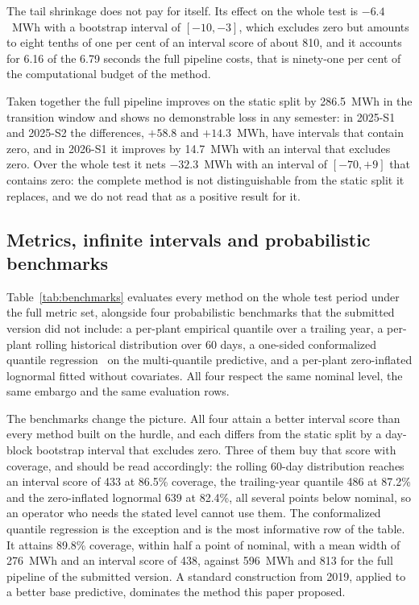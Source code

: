 \documentclass[preprint,3p,times]{elsarticle}
\begin{document}
The tail shrinkage does not pay for itself. Its effect on the whole test is $-6.4$~MWh with a bootstrap interval of $[-10,-3]$, which excludes zero but amounts to eight tenths of one per cent of an interval score of about 810, and it accounts for 6.16 of the 6.79 seconds the full pipeline costs, that is ninety-one per cent of the computational budget of the method.

Taken together the full pipeline improves on the static split by 286.5~MWh in the transition window and shows no demonstrable loss in any semester: in 2025-S1 and 2025-S2 the differences, $+58.8$ and $+14.3$~MWh, have intervals that contain zero, and in 2026-S1 it improves by 14.7~MWh with an interval that excludes zero. Over the whole test it nets $-32.3$~MWh with an interval of $[-70,+9]$ that contains zero: the complete method is not distinguishable from the static split it replaces, and we do not read that as a positive result for it.

\subsection{Metrics, infinite intervals and probabilistic benchmarks}
\label{sec:metricas}

Table~\ref{tab:benchmarks} evaluates every method on the whole test period under the full metric set, alongside four probabilistic benchmarks that the submitted version did not include: a per-plant empirical quantile over a trailing year, a per-plant rolling historical distribution over 60 days, a one-sided conformalized quantile regression~\cite{romano2019} on the multi-quantile predictive, and a per-plant zero-inflated lognormal fitted without covariates. All four respect the same nominal level, the same embargo and the same evaluation rows.



The benchmarks change the picture. All four attain a better interval score than every method built on the hurdle, and each differs from the static split by a day-block bootstrap interval that excludes zero. Three of them buy that score with coverage, and should be read accordingly: the rolling 60-day distribution reaches an interval score of 433 at 86.5\% coverage, the trailing-year quantile 486 at 87.2\% and the zero-inflated lognormal 639 at 82.4\%, all several points below nominal, so an operator who needs the stated level cannot use them. The conformalized quantile regression is the exception and is the most informative row of the table. It attains 89.8\% coverage, within half a point of nominal, with a mean width of 276~MWh and an interval score of 438, against 596~MWh and 813 for the full pipeline of the submitted version. A standard construction from 2019, applied to a better base predictive, dominates the method this paper proposed.
\end{document}

